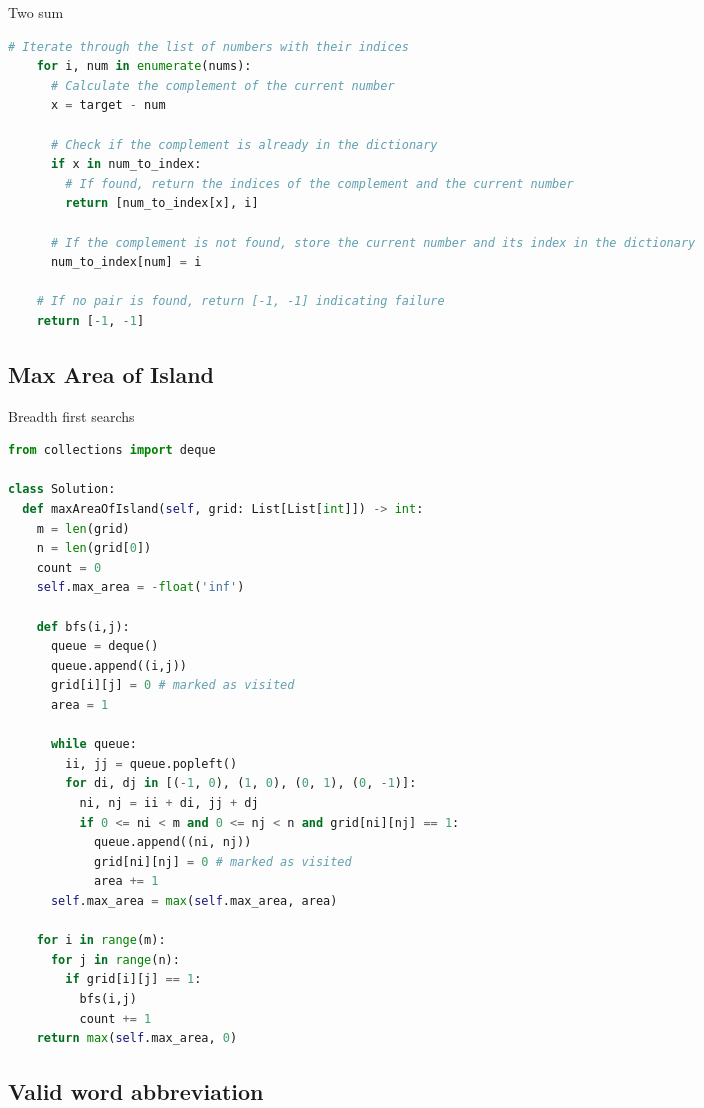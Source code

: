 \documentclass[a4paper,12pt]{article}
\begin{document}
\begin{multicols}{2}
\begin{mycode}[label={lst:two-sum}]{Two sum}
\begin{lstlisting}[language=Python]
    # Iterate through the list of numbers with their indices
    for i, num in enumerate(nums):
      # Calculate the complement of the current number
      x = target - num
      
      # Check if the complement is already in the dictionary
      if x in num_to_index:
        # If found, return the indices of the complement and the current number
        return [num_to_index[x], i]
      
      # If the complement is not found, store the current number and its index in the dictionary
      num_to_index[num] = i
    
    # If no pair is found, return [-1, -1] indicating failure
    return [-1, -1]
\end{lstlisting}
\end{mycode}



\subsection{Max Area of Island}
\begin{mycode}[label={lst:max-area-of-island}]{Breadth first searchs}
\begin{lstlisting}[language=Python]
from collections import deque

class Solution:
  def maxAreaOfIsland(self, grid: List[List[int]]) -> int:
    m = len(grid)
    n = len(grid[0])
    count = 0
    self.max_area = -float('inf')

    def bfs(i,j):
      queue = deque()
      queue.append((i,j))
      grid[i][j] = 0 # marked as visited
      area = 1

      while queue:
        ii, jj = queue.popleft()
        for di, dj in [(-1, 0), (1, 0), (0, 1), (0, -1)]:
          ni, nj = ii + di, jj + dj
          if 0 <= ni < m and 0 <= nj < n and grid[ni][nj] == 1:
            queue.append((ni, nj))
            grid[ni][nj] = 0 # marked as visited
            area += 1
      self.max_area = max(self.max_area, area)
    
    for i in range(m):
      for j in range(n):
        if grid[i][j] == 1:
          bfs(i,j)
          count += 1
    return max(self.max_area, 0)
\end{lstlisting}
\end{mycode}

\subsection{Valid word abbreviation}


\end{multicols}
\end{document}
